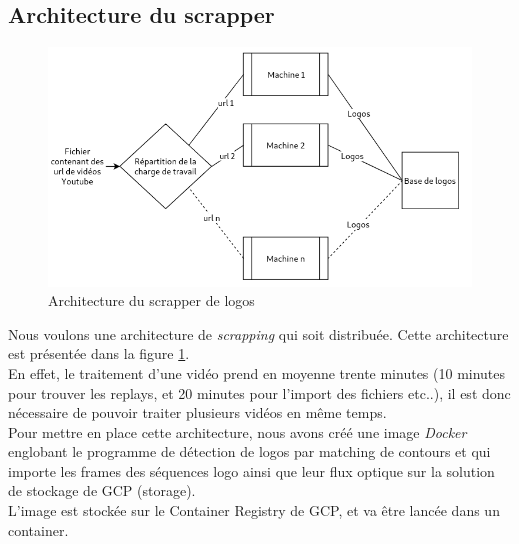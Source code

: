 \documentclass[11pt]{article}
\begin{document}
\subsection{Architecture du scrapper}
\label{sec:orgc85495f}
\begin{figure}[htbp]
\centering
\includegraphics[width=15cm]{arch_scrap.png}
\caption{Architecture du scrapper de logos \label{arch-scrap}}
\end{figure}
Nous voulons une architecture de \emph{scrapping} qui soit distribuée. Cette architecture est présentée dans la figure \ref{arch-scrap}.\\
En effet, le traitement d'une vidéo prend en moyenne trente minutes (10 minutes pour trouver les replays, et 20 minutes pour l'import des fichiers etc..), il est donc nécessaire de pouvoir traiter plusieurs vidéos en même temps.\\
Pour mettre en place cette architecture, nous avons créé une image \emph{Docker} englobant le programme de détection de logos par matching de contours et qui importe les frames des séquences logo ainsi que leur flux optique sur la solution de stockage de GCP (storage).\\
L'image est stockée sur le Container Registry de GCP, et va être lancée dans un container.\\
\end{document}
